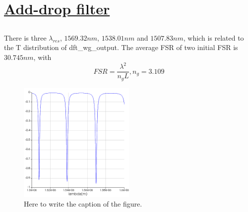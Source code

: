 \documentclass[fontsize=11pt]{scrartcl}
\begin{document}
\section{\uline{Add-drop filter}}
\subsection{}
There is three $\lambda_{res}$, $1569.32nm$, $1538.01nm$ and $1507.83nm$, which is related to 
the T distribution of dft\_wg\_output. The average FSR of two initial FSR is $30.745nm$, with 
\begin{equation} 
    FSR =  \frac{\lambda ^{2} }{n_gL}, n_g=3.109
    \label{eq3}
\end{equation}
\begin{figure}[H]
    \centering
     \includegraphics[width=0.5\textwidth]{img/fig3.1.png}
     \caption{Here to write the caption of the figure.}
     \label{fig3.1}
\end{figure} 
\end{document}
